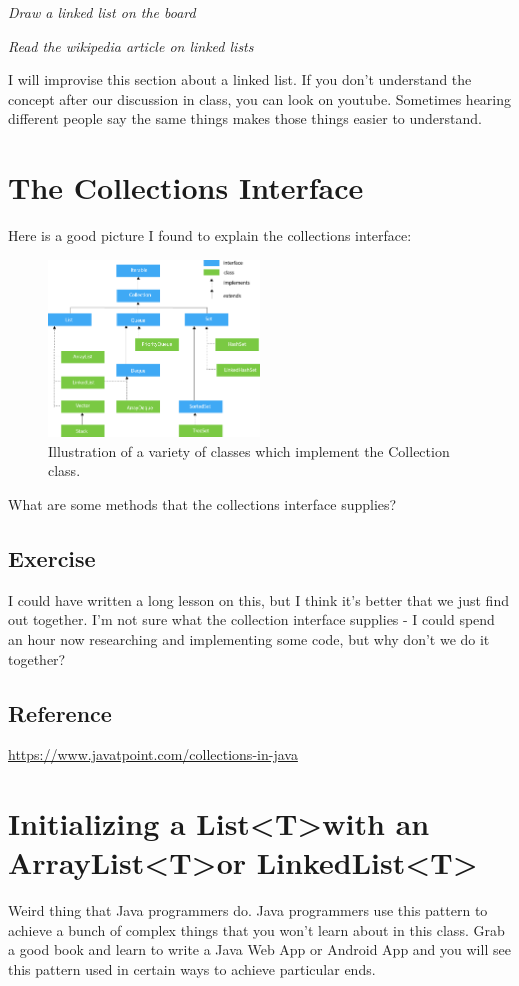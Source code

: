 \documentclass[12pt]{article}
\begin{document}
\textit{Draw a linked list on the board} 

\textit{Read the wikipedia article on linked lists}

I will improvise this section about a linked list. If you don't understand the concept after our discussion in class, you can look on youtube. Sometimes hearing different people say the same things makes those things easier to understand.

\section{The Collections Interface}
Here is a good picture I found to explain the collections interface:

\begin{figure}[h]
  \centering
    \includegraphics[width=0.5\textwidth]{java-collection-hierarchy.png}
  \caption{Illustration of a variety of classes which implement the Collection class.}
\end{figure}


What are some methods that the  collections interface supplies?

\subsection{Exercise}
I could have written a long lesson on this, but I think it's better that we just find out together. I'm not sure what the collection interface supplies - I could spend an hour now researching and implementing some code, but why don't we do it together?

\subsection{Reference}


\url{https://www.javatpoint.com/collections-in-java}

\section{Initializing a List\textless T\textgreater with an ArrayList\textless T\textgreater or LinkedList\textless T\textgreater}
Weird thing that Java programmers do. Java programmers use this pattern to achieve a bunch of complex things that you won't learn about in this class. Grab a good book and learn to write a Java Web App or Android App and you will see this pattern used in certain ways to achieve particular ends.
\end{document}
